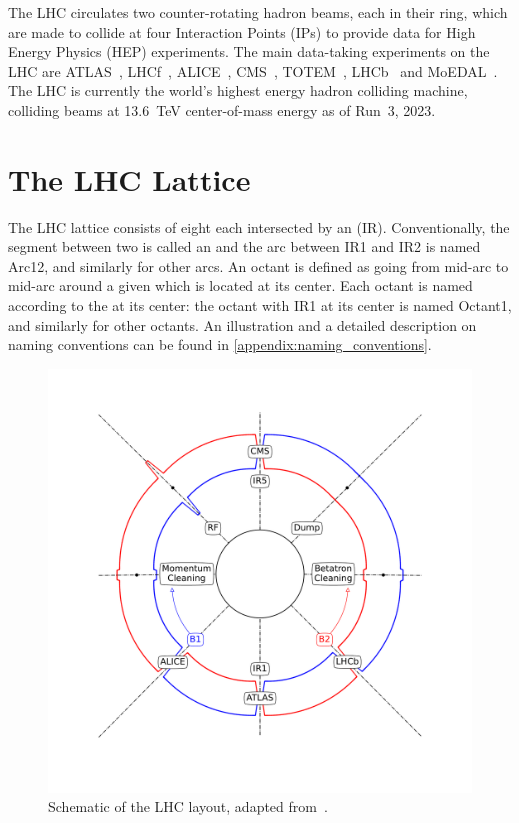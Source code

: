 The LHC circulates two counter-rotating hadron beams, each in their ring, which are made to collide at four Interaction Points (IPs) to provide data for High Energy Physics (HEP) experiments.
The main data-taking experiments on the LHC are ATLAS~\cite{ATLAS_Paper,Website:ATLAS,Website:ATLAS_CDS}, LHCf~\cite{LHCf_Paper,Website:LHCf,Website:LHCf_CDS}, ALICE~\cite{ALICE_Paper,Website:ALICE,Website:ALICE_CDS}, CMS~\cite{CMS_Paper,Website:CMS,Website:CMS_CDS}, TOTEM~\cite{TOTEM_Paper,Website:TOTEM,Website:TOTEM_CDS}, LHCb~\cite{LHCb_Paper,Website:LHCb,Website:LHCb_CDS} and MoEDAL~\cite{MoEDAL_Paper,Website:MOEDAL,Website:MOEDAL_CDS}.
The LHC is currently the world's highest energy hadron colliding machine, colliding beams at \qty{13.6}{\tera\electronvolt} center-of-mass energy as of Run~\num{3}, \num{2023}.


\section{The LHC Lattice}
\label{section:lhc_lattice}

The LHC lattice consists of eight  each intersected by an  (IR).
Conventionally, the segment between two \IRs is called an  and the arc between IR1 and IR2 is named Arc12, and similarly for other arcs.
An octant is defined as going from mid-arc to mid-arc around a given \IR which is located at its center.
Each octant is named according to the \IR at its center: the octant with IR\num{1} at its center is named Octant1, and similarly for other octants.
An illustration and a detailed description on naming conventions can be found in \cref{appendix:naming_conventions}.

\begin{figure}[!h]
  \centering
  \includegraphics*[width=0.69\linewidth]{Figures/Optics_Measurements_Corrections_at_LHC/lhc_schematic.pdf}
  \caption{Schematic of the LHC layout, adapted from~\cite{PHD:Poyet}.}
  \label{figure:lhc_schematic_layout}
\end{figure}

